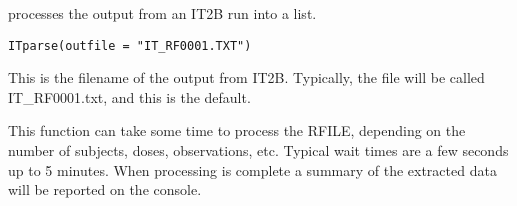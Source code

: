 \documentclass[a4paper]{book}
\begin{document}
%
\begin{Description}\relax
{} processes the output from an IT2B run into a list.
\end{Description}
%
\begin{Usage}
\begin{verbatim}
ITparse(outfile = "IT_RF0001.TXT")
\end{verbatim}
\end{Usage}
%
\begin{Arguments}
\begin{ldescription}
\item[\code{outfile}] This is the filename of the output from IT2B. Typically,
the file will be called IT\_RF0001.txt, and this is the default.
\end{ldescription}
\end{Arguments}
%
\begin{Details}\relax
This function can take some time to process the RFILE, depending on the number of subjects,
doses, observations, etc.  Typical wait times are a few seconds up to 5 minutes.
When processing is complete a summary of the extracted data will be reported on the console.
\end{Details}
%
\end{document}
